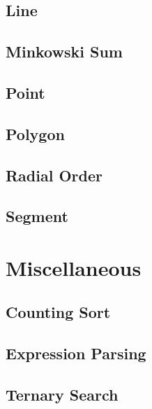 \subsection{Line}
\raggedbottom
\hrulefill
\subsection{Minkowski Sum}
\raggedbottom
\hrulefill
\subsection{Point}
\raggedbottom
\hrulefill
\subsection{Polygon}
\raggedbottom
\hrulefill
\subsection{Radial Order}
\raggedbottom
\hrulefill
\subsection{Segment}
\raggedbottom
\hrulefill

\section{Miscellaneous}
\subsection{Counting Sort}
\raggedbottom
\hrulefill
\subsection{Expression Parsing}
\raggedbottom
\hrulefill
\subsection{Ternary Search}
\raggedbottom
\hrulefill

